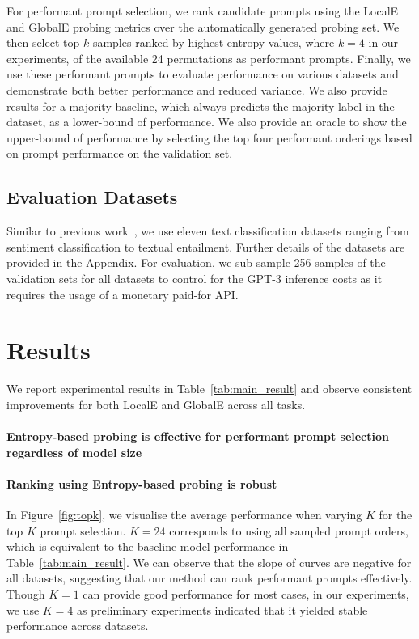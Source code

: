 For performant prompt selection, we rank candidate prompts using the LocalE and GlobalE probing metrics over the automatically generated probing set. We then select top $k$ samples ranked by highest entropy values, where $k=4$ in our experiments, of the available 24 permutations as performant prompts. Finally, we use these performant prompts to evaluate performance on various datasets and demonstrate both better performance and reduced variance. We also provide results for a majority baseline, which always predicts the majority label in the dataset, as a lower-bound of performance. We also provide an oracle to show the upper-bound of performance by selecting the top four performant orderings based on prompt performance on the validation set.

\subsection{Evaluation Datasets} Similar to previous work~\cite{gao2020making, zhao2021calibrate}, we use eleven text classification datasets ranging from sentiment classification to textual entailment. Further details of the datasets are provided in the Appendix. For evaluation, we sub-sample 256 samples of the validation sets for all datasets to control for the GPT-3 inference costs as it requires the usage of a monetary paid-for API.

\section{Results}\label{sec:main-result}
We report experimental results in Table~\ref{tab:main_result} and observe consistent improvements for both LocalE and GlobalE across all tasks. 

\paragraph{Entropy-based probing is effective for performant prompt selection regardless of model size}

\paragraph{Ranking using Entropy-based probing is robust}{ In Figure~\ref{fig:topk}, we visualise the average performance when varying $K$ for the top $K$ prompt selection. $K=24$ corresponds to using all sampled prompt orders, which is equivalent to the baseline model performance in Table~\ref{tab:main_result}.
We can observe that the slope of curves are negative for all datasets, suggesting that our method can rank performant prompts effectively. Though $K=1$ can provide good performance for most cases, in our experiments, we use $K=4$ as preliminary experiments indicated that it yielded stable performance across datasets. }

